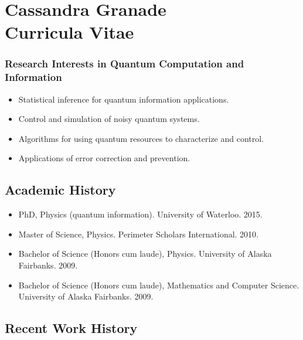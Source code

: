 \documentclass[]{article}
\date{}
\begin{document}
\section{\texorpdfstring{Cassandra Granade\\Curricula
Vitae}{Cassandra Granade Curricula Vitae}}\label{christopher-granade-curricula-vitae}

\subsubsection{Research Interests in Quantum Computation and
Information}\label{research-interests-in-quantum-computation-and-information}

\begin{itemize}
\itemsep1pt\parskip0pt
\item
  Statistical inference for quantum information applications.
\item
  Control and simulation of noisy quantum systems.
\item
  Algorithms for using quantum resources to characterize and control.
\item
  Applications of error correction and prevention.
\end{itemize}

\subsection{Academic History}\label{academic-history}

\begin{itemize}
\itemsep1pt\parskip0pt
\item
  PhD, Physics (quantum information). University of Waterloo. 2015.
\item
  Master of Science, Physics. Perimeter Scholars International. 2010.
\item
  Bachelor of Science (Honors cum laude), Physics. University of Alaska
  Fairbanks. 2009.
\item
  Bachelor of Science (Honors cum laude), Mathematics and Computer
  Science. University of Alaska Fairbanks. 2009.
\end{itemize}

\subsection{Recent Work History}\label{recent-work-history}
\end{document}
